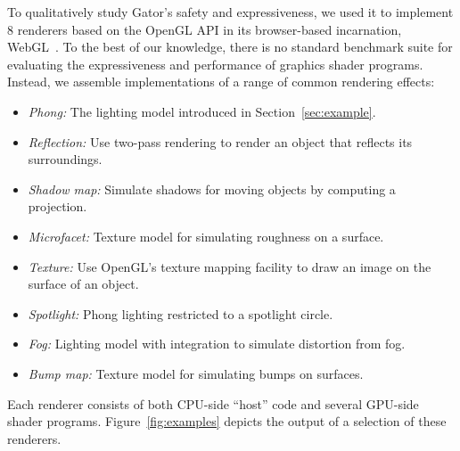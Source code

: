 \documentclass[../main.tex]{subfiles}
\begin{document}
{%

To qualitatively study Gator's safety and expressiveness, we used it to implement 8 renderers based on the OpenGL API in its browser-based incarnation, WebGL~\cite{webgl}.
To the best of our knowledge, there is no standard benchmark suite for evaluating the expressiveness and performance of graphics shader programs.
Instead, we assemble implementations of a range of common rendering effects:
%
\begin{itemize}
	\item \emph{Phong:} The lighting model introduced in Section~\ref{sec:example}.
	\item \emph{Reflection:} Use two-pass rendering to render an object that reflects its surroundings.
	\item \emph{Shadow map:} Simulate shadows for moving objects by computing a projection.
	\item \emph{Microfacet:} Texture model for simulating roughness on a surface.
	\item \emph{Texture:} Use OpenGL's texture mapping facility to draw an image on the surface of an object.
	\item \emph{Spotlight:} Phong lighting restricted to a spotlight circle.
	\item \emph{Fog:} Lighting model with integration to simulate distortion from fog.
	\item \emph{Bump map:} Texture model for simulating bumps on surfaces.
\end{itemize}
%
Each renderer consists of both CPU-side ``host'' code and several GPU-side shader programs.
Figure~\ref{fig:examples} depicts the output of a selection of these renderers.

}
\end{document}
